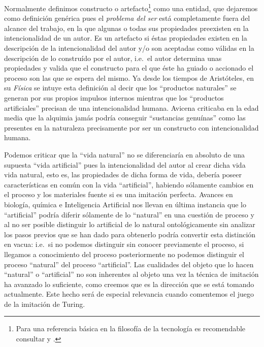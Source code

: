 \documentclass[12pt]{memoir}
\begin{document}
Normalmente definimos constructo o artefacto\footnote{Para una referencia básica en la filosofía de la tecnología es recomendable consultar \cite{sep-technology} y \cite{sep-artifact}.} como una entidad, que dejaremos como definición genérica pues el \textit{problema del ser} está completamente fuera del alcance del trabajo, en la que algunas o todas sus propiedades preexisten en la intencionalidad de un autor. Es un artefacto si éstas propiedades existen en la descripción de la intencionalidad del autor y/o son aceptadas como válidas en la descripción de lo construído por el autor, i.e.\ el autor determina unas propiedades y valida que el constructo para el que éste ha guiado o accionado el proceso son las que se espera del mismo. Ya desde los tiempos de Aristóteles, en su \textit{Física} se intuye esta definición al decir que los ``productos naturales'' se generan por sus propios impulsos internos mientras que los ``productos artificiales'' precisan de una intencionalidad humana. Avicena criticaba en la edad media que la alquimia jamás podría conseguir ``sustancias genuínas'' como las presentes en la naturaleza precisamente por ser un constructo con intencionalidad humana. 

Podemos criticar que la ``vida natural'' no se diferenciaría en absoluto de una supuesta ``vida artificial'' pues la intencionalidad del autor al crear dicha vida vida natural, esto es, las propiedades de dicha forma de vida, debería poseer características en común con la vida ``artificial'', habiendo sólamente cambios en el proceso y los materiales fuente si es una imitación perfecta. Avances en biología, química e Inteligencia Artificial nos llevan en última instancia que lo ``artificial'' podría diferir sólamente de lo ``natural'' en una cuestión de proceso y al no ser posible distinguir lo artificial de lo natural ontológicamente sin analizar los pasos previos que se han dado para obtenerlo podría convertir esta distinción en vacua: i.e.\ si no podemos distinguir sin conocer previamente el proceso, si llegamos a conocimiento del proceso posteriormente no podemos distinguir el proceso ``natural'' del proceso ``artificial''. Las cualidades del objeto que lo hacen ``natural'' o ``artificial'' no son inherentes al objeto una vez la técnica de imitación ha avanzado lo suficiente, como creemos que es la dirección que se está tomando actualmente. Este hecho será de especial relevancia cuando comentemos el juego de la imitación de Turing.
\end{document}
